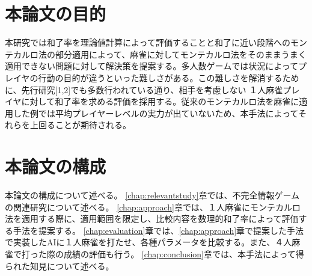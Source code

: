 \section{本論文の目的}
本研究では和了率を理論値計算によって評価することと和了に近い段階へのモンテカルロ法の部分適用によって、麻雀に対してモンテカルロ法をそのままうまく適用できない問題に対して解決策を提案する。多人数ゲームでは状況によってプレイヤの行動の目的が違うといった難しさがある。この難しさを解消するために、先行研究[1,2]でも多数行われている通り、相手を考慮しない １人麻雀プレイヤに対して和了率を求める評価を採用する。従来のモンテカルロ法を麻雀に適用した例では平均プレイヤーレベルの実力が出ていないため、本手法によってそれらを上回ることが期待される。
\section{本論文の構成}
本論文の構成について述べる。
\ref{chap:relevantstudy}章では、不完全情報ゲームの関連研究について述べる。
\ref{chap:approach}章では、１人麻雀にモンテカルロ法を適用する際に、適用範囲を限定し、比較内容を数理的和了率によって評価する手法を提案する。
\ref{chap:evaluation}章では、\ref{chap:approach}章で提案した手法で実装したAIに１人麻雀を打たせ、各種パラメータを比較する。また、４人麻雀で打った際の成績の評価も行う。
\ref{chap:conclusion}章では、本手法によって得られた知見について述べる。
